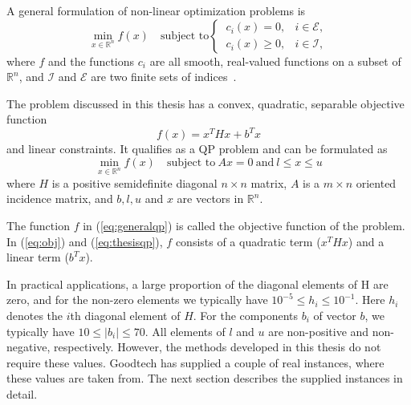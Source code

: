A general formulation of non-linear optimization problems is
\begin{equation}
    \label{eq:generalqp}
    \min_{x \in \mathbb{R}^n} f(x) \quad \textrm{subject to}
    \begin{cases}
        ~c_i(x) = 0,   & i \in \mathcal{E}, \\
        ~c_i(x) \ge 0, & i \in \mathcal{I},
    \end{cases}
\end{equation}
where $f$ and the functions $c_i$ are all smooth, real-valued functions on a
subset of $\mathbb{R}^n$, and $\mathcal{I}$ and $\mathcal{E}$ are two finite
sets of indices~\cite{nocedal}.

The problem discussed in this thesis has a convex, quadratic, separable
objective function
\begin{equation}
    \label{eq:obj}
    f(x) = x^T H x + b^T x
\end{equation}
and linear constraints. It qualifies as a QP problem and can be formulated as
\begin{equation}
    \label{eq:thesisqp}
    \min_{x \in \mathbb{R}^n} f(x)
    \quad \textrm{subject to}
    ~
    Ax = 0
    ~
    \textrm{and}
    ~
    l \le x \le u
\end{equation}
where $H$ is a positive semidefinite diagonal $n \times n$ matrix, $A$ is a
$m \times n$ oriented incidence matrix, and $b, l, u$ and $x$ are vectors in
$\mathbb{R}^n$.

The function $f$ in (\ref{eq:generalqp}) is called the objective function of
the problem. In (\ref{eq:obj}) and (\ref{eq:thesisqp}), $f$ consists of a
quadratic term ($x^T H x$) and a linear term ($b^T x$).

In practical applications, a large proportion of the diagonal elements of H are
zero, and for the non-zero elements we typically have
$10^{-5} \le h_i \le 10^{-1}$. Here $h_i$ denotes the $i$th diagonal element of
$H$. For the components $b_i$ of vector $b$, we typically have
$10 \le |b_i| \le 70$. All elements of $l$ and $u$ are non-positive 
and non-negative, respectively. However, the methods developed in this thesis
do not require these values. Goodtech has supplied a couple of real instances,
where these values are taken from. The next section describes the supplied
instances in detail.
